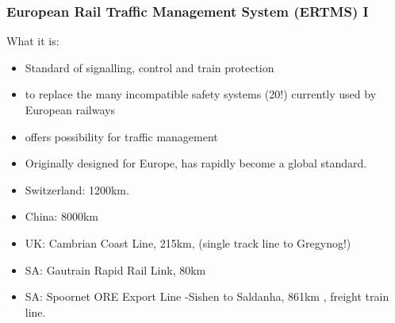 \documentclass{beamer}
\begin{document}




\begin{frame}

\frametitle{European Rail Traffic Management System (ERTMS) I}

What it is:
\begin{itemize}

\item
Standard of signalling, control and train protection

\item
to replace the many incompatible safety systems (20!) currently used by
European railways

\item 
offers possibility for traffic management

\item Originally designed for Europe, has rapidly become a global standard.

\item Switzerland: 1200km.

\item China: 8000km

\item UK: Cambrian Coast Line, 215km, (single track line to Gregynog!)

\item SA: Gautrain Rapid Rail Link, 80km 

\item SA: Spoornet ORE Export Line -Sishen to Saldanha, 861km , freight train line.
\end{itemize}




\end{frame}
\end{document}
